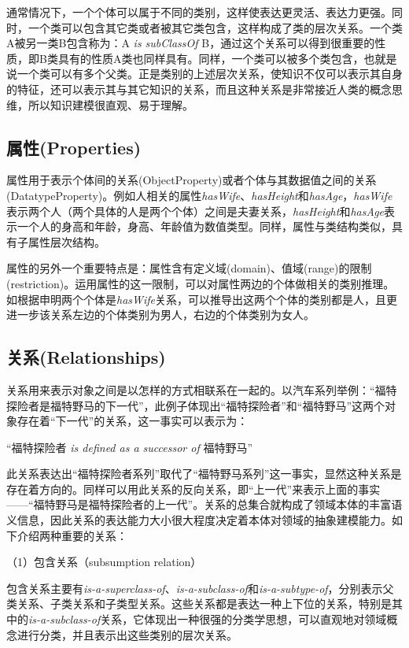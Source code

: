 通常情况下，一个个体可以属于不同的类别，这样使表达更灵活、表达力更强。同时，一个类可以包含其它类或者被其它类包含，这样构成了类的层次关系。一个类A被另一类B包含称为：A \textit{is subClassOf} B，通过这个关系可以得到很重要的性质，即B类具有的性质A类也同样具有。同样，一个类可以被多个类包含，也就是说一个类可以有多个父类。正是类别的上述层次关系，使知识不仅可以表示其自身的特征，还可以表示其与其它知识的关系，而且这种关系是非常接近人类的概念思维，所以知识建模很直观、易于理解。

\subsection{属性(Properties)}
属性用于表示个体间的关系(ObjectProperty)或者个体与其数据值之间的关系(DatatypeProperty)。例如人相关的属性\textit{hasWife}、\textit{hasHeight}和\textit{hasAge}，\textit{hasWife}表示两个人（两个具体的人是两个个体）之间是夫妻关系，\textit{hasHeight}和\textit{hasAge}表示一个人的身高和年龄，身高、年龄值为数值类型。同样，属性与类结构类似，具有子属性层次结构。

属性的另外一个重要特点是：属性含有定义域(domain)、值域(range)的限制(restriction)。运用属性的这一限制，可以对属性两边的个体做相关的类别推理。如根据申明两个个体是\textit{hasWife}关系，可以推导出这两个个体的类别都是人，且更进一步该关系左边的个体类别为男人，右边的个体类别为女人。

\subsection{关系(Relationships)}
关系用来表示对象之间是以怎样的方式相联系在一起的。以汽车系列举例：“福特探险者是福特野马的下一代”，此例子体现出“福特探险者”和“福特野马”这两个对象存在着“下一代”的关系，这一事实可以表示为：

\begin{center}
	“福特探险者 \textit{is defined as a successor of} 福特野马”
\end{center}

此关系表达出“福特探险者系列”取代了“福特野马系列”这一事实，显然这种关系是存在着方向的。同样可以用此关系的反向关系，即“上一代”来表示上面的事实——“福特野马是福特探险者的上一代”。关系的总集合就构成了领域本体的丰富语义信息，因此关系的表达能力大小很大程度决定着本体对领域的抽象建模能力。如下介绍两种重要的关系：

（1）包含关系（subsumption relation）

包含关系主要有\textit{is-a-superclass-of}、\textit{is-a-subclass-of}和\textit{is-a-subtype-of}，分别表示父类关系、子类关系和子类型关系。这些关系都是表达一种上下位的关系，特别是其中的\textit{is-a-subclass-of}关系，它体现出一种很强的分类学思想，可以直观地对领域概念进行分类，并且表示出这些类别的层次关系。


